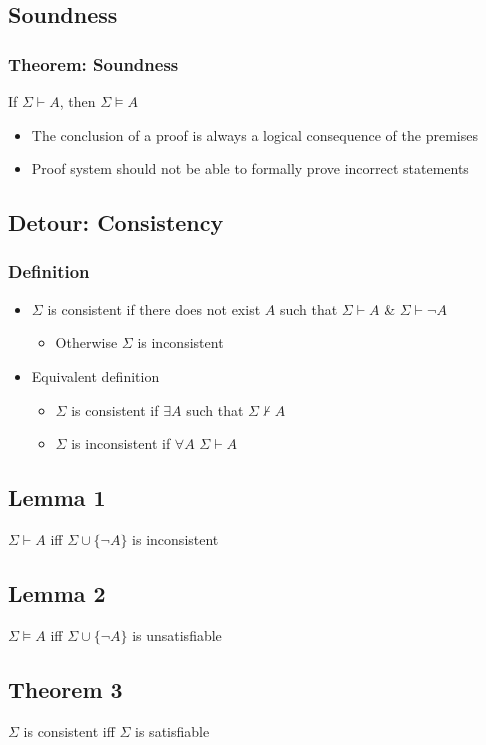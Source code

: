\documentclass[11pt]{article}
\begin{document}
\subsection{Soundness}
\subsubsection{Theorem: Soundness}
If $\Sigma\vdash A$, then $\Sigma\vDash A$
\begin{itemize}
    \item The conclusion of a proof is always a logical consequence of the premises 
    \item Proof system should not be able to formally prove incorrect statements
\end{itemize}
\subsection{Detour: Consistency}
\subsubsection{Definition}
\begin{itemize}
    \item $\Sigma$ is consistent if there does not exist $A$ such that $\Sigma\vdash A$ \& $\Sigma\vdash \neg A$
    \begin{itemize}
        \item Otherwise $\Sigma$ is inconsistent
    \end{itemize}
    \item Equivalent definition 
    \begin{itemize}
        \item $\Sigma$ is consistent if $\exists A$ such that $\Sigma \nvdash A$
        \item $\Sigma$ is inconsistent if $\forall A$ $\Sigma\vdash A$
    \end{itemize}
\end{itemize}
\subsection{Lemma 1}
$\Sigma\vdash A$ iff $\Sigma\cup\{\neg A\}$ is inconsistent 
\subsection{Lemma 2}
$\Sigma\vDash A$ iff $\Sigma\cup\{\neg A\}$ is unsatisfiable 
\subsection{Theorem 3}
$\Sigma$ is consistent iff $\Sigma$ is satisfiable 
\end{document}

